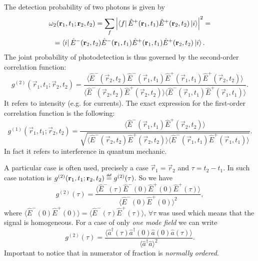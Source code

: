 The detection probability of two photons is given by
\begin{multline}
	\omega_2 (\mathbf{r}_1, t_1; \mathbf{r}_2, t_2) = \sum_{f} \left| \left\langle {f} \right\rvert \hat{E}^+ (\mathbf{r}_1 ,t_1) \hat{E}^+ (\mathbf{r}_2 , t_2) \left\lvert {i} \right\rangle \right|^2 = \\ = \left\langle {i} \right\rvert \hat{E}^- (\mathbf{r}_2 , t_2) \hat{E}^- (\mathbf{r}_1 , t_1) \hat{E}^+ (\mathbf{r}_1 , t_1) \hat{E}^+ (\mathbf{r}_2 , t_2) \left\lvert {i} \right\rangle.
\end{multline}
The joint probability of photodetection is thus governed by the second-order correlation function:
\begin{equation}
	g^{(2)}(\vec{r}_1, t_1; \vec{r}_2, t_2) = \frac{\langle \hat{E}^-(\vec{r}_2, t_2) \hat{E}^-(\vec{r}_1, t_1) \hat{E}^+(\vec{r}_1, t_1) \hat{E}^+(\vec{r}_2, t_2)\rangle}{\langle \hat{E}^-(\vec{r}_2, t_2) \hat{E}^+(\vec{r}_2, t_2) \rangle \langle \hat{E}^-(\vec{r}_1, t_1) \hat{E}^+(\vec{r}_1, t_1) \rangle}.
\end{equation}
It refers to intensity (e.g. for currents). The exact expression for the first-order correlation function is the following:
\begin{equation}
	g^{(1)} (\vec{r}_1, t_1; \vec{r}_2, t_2) = \frac{\langle \hat{E}^-(\vec{r}_1, t_1) \hat{E}^+ (\vec{r}_2, t_2) \rangle}{\sqrt{\langle \hat{E}^-(\vec{r}_2, t_2) \hat{E}^+(\vec{r}_2, t_2) \rangle \langle \hat{E}^-(\vec{r}_1, t_1) \hat{E}^+(\vec{r}_1, t_1) \rangle}}.
\end{equation}
In fact it refers to interference in quantum mechanic.

A particular case is often used, precisely a case $\vec{r}_1 = \vec{r}_2$ and $\tau = t_2 - t_1$. In such case notation is $g^{(2)} (\vec{r}_1, t_1; \vec{r}_2, t_2) \myeq g^{(2)} (\tau)$. So we have
\begin{equation}
	g^{(2)} (\tau) = \frac{\langle \hat{E}^-(\tau) \hat{E}^-(0) \hat{E}^+(0) \hat{E}^+(\tau)\rangle}{\langle \hat{E}^-(0) \hat{E}^+(0) \rangle^2},
\end{equation}
where $\langle \hat{E}^-(0) \hat{E}^+(0) \rangle = \langle \hat{E}^-(\tau) \hat{E}^+(\tau) \rangle$, $\forall \tau$ was used which means that the signal is homogeneous. For a case of only \textit{one mode field} we can write
\begin{equation}
	g^{(2)} (\tau) = \frac{\langle \hat{a}^{\dagger} (\tau) \hat{a}^{\dagger} (0) \hat{a}(0) \hat{a}(\tau) \rangle}{\langle \hat{a}^{\dagger} \hat{a} \rangle^2}.
\end{equation}
Important to notice that in numerator of fraction is \textit{normally ordered}.

